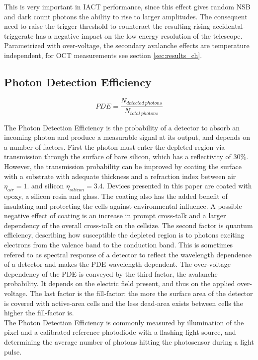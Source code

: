 \documentclass[12pt,article,type=msc,colorback,accentcolor=tud9c]{tudthesis}
\begin{document}
This is very important in IACT performance, since this effect gives random NSB and dark count photons the ability to rise to larger amplitudes. The consequent need to raise the trigger threshold to counteract the resulting rising accidental-triggerate has a negative impact on the low energy resolution of the telescope.\\

Parametrized with over-voltage, the secondary avalanche effects are temperature independent, for OCT measurements see section {\ref{sec:results_ch}}.




\subsection{Photon Detection Efficiency}
\label{subsec:SiPMPDE}

\begin{equation}
PDE = \frac{N_{detected\:photons}}{N_{total\:photons}}
\end{equation}

The Photon Detection Efficiency is the probability of a detector to absorb an incoming photon and produce a measurable signal at its output, and depends on a number of factors. First the photon must enter the depleted region via transmission through the surface of bare silicon, which has a reflectivity of 30$\%$. However, the transmission probability can be improved by coating the surface with a substrate with adequate thickness and a refraction index between air $\eta_{air} = 1.$ and silicon $\eta_{silicon} = 3.4$. Devices presented in this paper are coated with epoxy, a silicon resin and glass. The coating also has the added benefit of insulating and protecting the cells against environmental influence. A possible negative effect of coating is an increase in prompt cross-talk and a larger dependency of the overall cross-talk on the cellsize. The second factor is quantum efficiency, describing how susceptible the depleted region is to photons exciting electrons from the valence band to the conduction band. This is sometimes refered to as spectral response of a detector to reflect the wavelength dependence of a detector and makes the PDE wavelength dependent. The over-voltage dependency of the PDE is conveyed by the third factor, the avalanche probability. It depends on the electric field present, and thus on the applied over-voltage. The last factor is the fill-factor: the more the surface area of the detector is covered with active-area cells and the less dead-area exists between cells the higher the fill-factor is. \\
The Photon Detection Efficiency is commonly measured by illumination of the pixel and a calibrated reference photodiode with a flashing light source, and determining the average number of photons hitting the photosensor during a light pulse.
\end{document}
